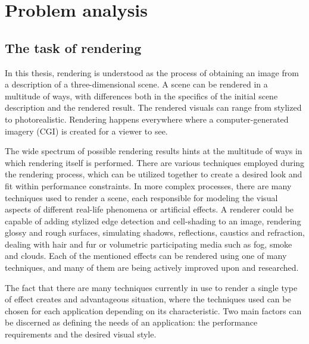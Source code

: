 \chapter{Problem analysis} %

\section{The task of rendering}

In this thesis, rendering is understood as the process of obtaining an image from a description of a three-dimensional scene. A scene can be rendered in a multitude of ways, with differences both in the specifics of the initial scene description and the rendered result. The rendered visuals can range from stylized to photorealistic. Rendering happens everywhere where a computer-generated imagery (CGI) is created for a viewer to see.

The wide spectrum of possible rendering results hints at the multitude of ways in which rendering itself is performed. There are various techniques employed during the rendering process, which can be utilized together to create a desired look and fit within performance constraints. In more complex processes, there are many techniques used to render a scene, each responsible for modeling the visual aspects of different real-life phenomena or artificial effects. A renderer could be capable of adding stylized edge detection and cell-shading to an image, rendering glossy and rough surfaces, simulating shadows, reflections, caustics and refraction, dealing with hair and fur or volumetric participating media such as fog, smoke and clouds. Each of the mentioned effects can be rendered using one of many techniques, and many of them are being actively improved upon and researched.

The fact that there are many techniques currently in use to render a single type of effect creates and advantageous situation, where the techniques used can be chosen for each application depending on its characteristic. Two main factors can be discerned as defining the needs of an application: the performance requirements and the desired visual style.

